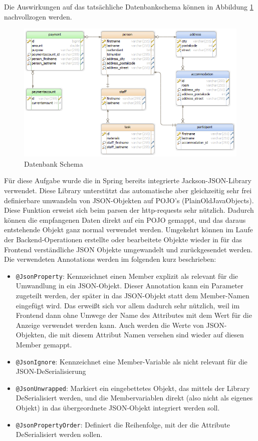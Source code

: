 Die Auswirkungen auf das tatsächliche Datenbankschema können in Abbildung \ref{fig:db_scheme} nachvollzogen werden.

\begin{figure}[h]
	\centering
	\includegraphics[width=0.9\linewidth]{3_backend/pics/db_scheme}
	\caption{Datenbank Schema}
	\label{fig:db_scheme}
\end{figure}


Für diese Aufgabe wurde die in Spring bereits integrierte Jackson-JSON-Library verwendet. Diese Library unterstützt das automatische aber gleichzeitig sehr frei definierbare umwandeln von JSON-Objekten auf POJO's (PlainOldJavaObjects). Diese Funktion erweist sich beim parsen der http-requests sehr nützlich. Dadurch können die empfangenen Daten direkt auf ein POJO gemappt, und das daraus entstehende Objekt ganz normal verwendet werden. Umgekehrt können im Laufe der Backend-Operationen erstellte oder bearbeitete Objekte wieder in für das Frontend verständliche JSON Objekte umgewandelt und zurückgesendet werden. Die verwendeten Annotations werden im folgenden kurz beschrieben:

\begin{itemize}
	\item \verb|@JsonProperty|: Kennzeichnet einen Member explizit als relevant für die Umwandlung in ein JSON-Objekt. Dieser Annotation kann ein Parameter zugeteilt werden, der später in das JSON-Objekt statt dem Member-Namen eingefügt wird. Das erweißt sich vor allem dadurch sehr nützlich, weil im Frontend dann ohne Umwege der Name des Attributes mit dem Wert für die Anzeige verwendet werden kann. Auch werden die Werte von JSON-Objekten, die mit diesem Attribut Namen versehen sind wieder auf diesen Member gemappt.
	\item \verb|@JsonIgnore|: Kennzeichnet eine Member-Variable als nicht relevant für die JSON-DeSerialisierung
	\item \verb|@JsonUnwrapped|: Markiert ein eingebettetes Objekt, das mittels der Library DeSerialisiert werden, und die Membervariablen direkt (also nicht als eigenes Objekt) in das übergeordnete JSON-Objekt integriert werden soll.
	\item \verb|@JsonPropertyOrder|: Definiert die Reihenfolge, mit der die Attribute DeSerialisiert werden sollen.
\end{itemize}

